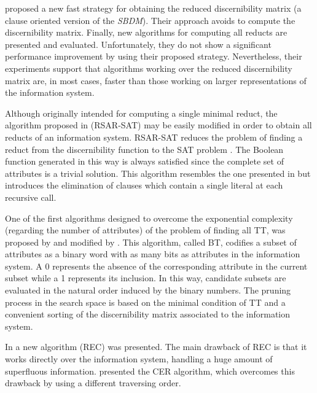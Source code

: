 \documentclass[authoryear,preprint,review,12pt]{elsarticle}
\begin{document}
  \cite{Chen2012} proposed a new fast strategy for obtaining the reduced discernibility matrix (a clause oriented version of the \textit{SBDM}). Their approach avoids to compute the discernibility matrix. Finally, new algorithms for computing all reducts are presented and evaluated. Unfortunately, they do not show a significant performance improvement by using their proposed strategy. Nevertheless, their experiments support that algorithms working over the reduced discernibility matrix are, in most cases, faster than those working on larger representations of the information system.
  
  Although originally intended for computing a single minimal reduct, the algorithm proposed in \citep{Jensen14} (RSAR-SAT) may be easily modified in order to obtain all reducts of an information system. RSAR-SAT reduces the problem of finding a reduct from the discernibility function to the SAT problem \citep{Davis62}. The Boolean function generated in this way is always satisfied since the complete set of attributes is a trivial solution. This algorithm resembles the one presented in \citep{Starzyk99} but introduces the elimination of clauses which contain a single literal at each recursive call. 

  One of the first algorithms designed to overcome the exponential complexity (regarding the number of attributes)
  of the problem of finding all TT, was proposed by \cite{Ruiz85} and modified by \cite{sanchez02}. This algorithm, called BT, codifies a subset of attributes as a binary word with as many bits as attributes in the information system. A 0 represents the absence of the corresponding attribute in the current subset while a 1 represents its inclusion. In this way, candidate subsets are evaluated in the natural order induced by the binary numbers. The pruning process in the search space is based on the minimal condition of TT and a convenient sorting of the discernibility matrix associated to the information system. 
  
  In \citep{Shulcloper95b} a new algorithm (REC) was presented.
  The main drawback of REC is that it works directly over the information system, handling a huge amount of superfluous
  information. \cite{Ayaquica97} presented the CER algorithm, which overcomes this drawback by using a different
  traversing order.  
  
\end{document}
